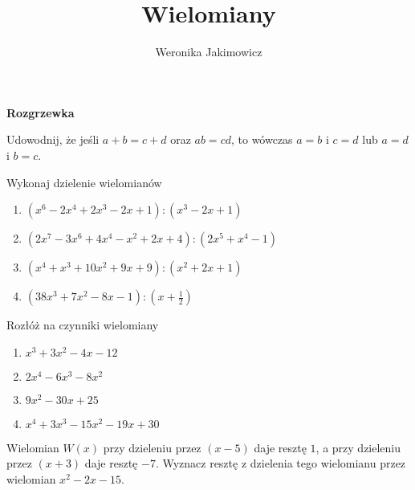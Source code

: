 \documentclass{article}
\title{Wielomiany}
\author{Weronika Jakimowicz}
\date{}
\begin{document}
\noindent\makebox[\linewidth]{\rule{\textwidth}{0.4pt}}

\textbf{\large Rozgrzewka}

  \begin{zadanie}
    Udowodnij, że jeśli $a+b=c+d$ oraz $ab=cd$, to wówczas $a=b$ i $c=d$ lub $a=d$ i $b=c$.
  \end{zadanie}

  \begin{zadanie}
    Wykonaj dzielenie wielomianów
    \begin{enumerate}
      \item $(x^6-2x^4+2x^3-2x+1):(x^3-2x+1)$
      \item $(2x^7-3x^6+4x^4-x^2+2x+4):(2x^5+x^4-1)$
      \item $(x^4+x^3+10x^2+9x+9):(x^2+2x+1)$ 
      \item $(38x^3+7x^2-8x-1):(x+\frac{1}{2})$
    \end{enumerate}
  \end{zadanie}

  \begin{zadanie}
    Rozłóż na czynniki wielomiany
    \begin{enumerate}
      \item $x^3+3x^2-4x-12$
      \item $2x^4-6x^3-8x^2$
      \item $9x^2-30x+25$
      \item $x^4+3x^3-15x^2-19x+30$
    \end{enumerate}
  \end{zadanie}

  \bigskip
\noindent\makebox[\linewidth]{\rule{\textwidth}{0.4pt}}

\begin{zadanie}
  Wielomian $W(x)$ przy dzieleniu przez $(x-5)$ daje resztę $1$, a przy dzieleniu przez $(x+3)$ daje resztę $-7$. Wyznacz resztę z dzielenia tego wielomianu przez wielomian $x^2-2x-15$.
\end{zadanie}
\end{document}
